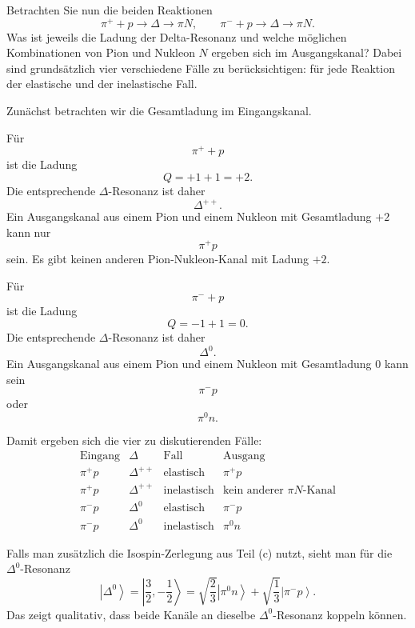 \documentclass[11pt,a4paper]{scrartcl}
\newcommand{\ket}[1]{\left|#1\right\rangle}
\begin{document}
Betrachten Sie nun die beiden Reaktionen
\[
\pi^+ + p \to \Delta \to \pi N,
\qquad
\pi^- + p \to \Delta \to \pi N.
\]
Was ist jeweils die Ladung der Delta-Resonanz und welche möglichen Kombinationen von Pion und Nukleon $N$ ergeben sich im Ausgangskanal? Dabei sind grundsätzlich vier verschiedene Fälle zu berücksichtigen: für jede Reaktion der elastische und der inelastische Fall.

\begin{calculationbox}
Zunächst betrachten wir die Gesamtladung im Eingangskanal.

\begin{calculationbox}
Für
\[
\pi^+ + p
\]
ist die Ladung
\[
Q=+1+1=+2.
\]
Die entsprechende $\Delta$-Resonanz ist daher
\[
\boxed{\Delta^{++}}.
\]
Ein Ausgangskanal aus einem Pion und einem Nukleon mit Gesamtladung $+2$ kann nur
\[
\boxed{\pi^+p}
\]
sein. Es gibt keinen anderen Pion-Nukleon-Kanal mit Ladung $+2$.
\end{calculationbox}

\begin{calculationbox}
Für
\[
\pi^-+p
\]
ist die Ladung
\[
Q=-1+1=0.
\]
Die entsprechende $\Delta$-Resonanz ist daher
\[
\boxed{\Delta^0}.
\]
Ein Ausgangskanal aus einem Pion und einem Nukleon mit Gesamtladung $0$ kann sein
\[
\boxed{\pi^-p}
\]
oder
\[
\boxed{\pi^0n}.
\]
\end{calculationbox}

\begin{calculationbox}
Damit ergeben sich die vier zu diskutierenden Fälle:
\[
\begin{array}{c|c|c|c}
\text{Eingang} & \Delta & \text{Fall} & \text{Ausgang}\\
\hline
\pi^+p & \Delta^{++} & \text{elastisch} & \pi^+p\\
\pi^+p & \Delta^{++} & \text{inelastisch} & \text{kein anderer }\pi N\text{-Kanal}\\
\pi^-p & \Delta^{0} & \text{elastisch} & \pi^-p\\
\pi^-p & \Delta^{0} & \text{inelastisch} & \pi^0n
\end{array}
\]
\end{calculationbox}

\begin{calculationbox}
Falls man zusätzlich die Isospin-Zerlegung aus Teil (c) nutzt, sieht man für die $\Delta^0$-Resonanz
\[
\ket{\Delta^0}=\ket{\frac32,-\frac12}
=\sqrt{\frac23}\ket{\pi^0n}
+\sqrt{\frac13}\ket{\pi^-p}.
\]
Das zeigt qualitativ, dass beide Kanäle an dieselbe $\Delta^0$-Resonanz koppeln können.
\end{calculationbox}
\end{calculationbox}
\end{document}
